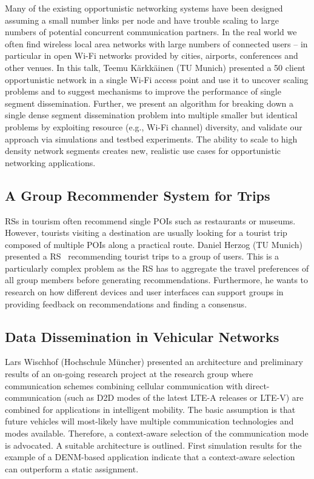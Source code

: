 Many of the existing opportunistic networking systems have been designed
assuming a small number links per node and have trouble scaling to large
numbers of potential concurrent communication partners. In the real world we
often find wireless local area networks with large numbers of connected users
– in particular in open Wi-Fi networks provided by cities, airports,
conferences and other venues. In this talk, Teemu Kärkkäinen (TU Munich)
presented a 50 client opportunistic network in a single Wi-Fi access point and
use it to uncover scaling problems and to suggest mechanisms to improve the
performance of single segment dissemination. Further, we present an algorithm
for breaking down a single dense segment dissemination problem into multiple
smaller but identical problems by exploiting resource (e.g., Wi-Fi channel)
diversity, and validate our approach via simulations and testbed experiments.
The ability to scale to high density network segments creates new, realistic
use cases for opportunistic networking applications.


\subsection{A Group Recommender System for Trips}

\ac{RSs} in tourism often recommend single \ac{POIs} such as restaurants or
museums. However, tourists visiting a destination are usually looking for a
tourist trip composed of multiple \ac{POIs} along a practical route. Daniel
Herzog (TU Munich) presented a \ac{RS}~\cite{dherzog:it:2017} recommending
tourist trips to a group of users.  This is a particularly complex problem as
the \ac{RS} has to aggregate the travel preferences of all group members
before generating recommendations. Furthermore, he wants to research on how
different devices and user interfaces can support groups in providing feedback
on recommendations and finding a consensus.

\subsection{Data Dissemination in Vehicular Networks}

Lars Wischhof (Hochschule Müncher) presented an architecture and preliminary
results of an on-going research project at the research group where
communication schemes combining cellular communication with
direct-communication (such as \ac{D2D} modes of the latest LTE-A releases or
LTE-V) are combined for applications in intelligent mobility. The basic
assumption is that future vehicles will most-likely have multiple
communication technologies and modes available. Therefore, a context-aware
selection of the communication mode is advocated. A suitable architecture is
outlined. First simulation results for the example of a DENM-based application
indicate that a context-aware selection can outperform a static assignment.


